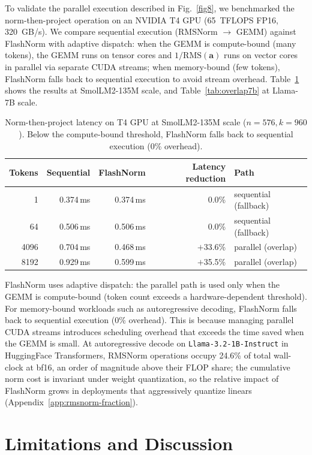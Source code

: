 \documentclass{article}
\begin{document}
To validate the parallel execution described in Fig.~\ref{fig8}, we benchmarked the norm-then-project operation on an NVIDIA T4 GPU (65~TFLOPS FP16, 320~GB/s). We compare sequential execution (RMSNorm $\rightarrow$ GEMM) against FlashNorm with adaptive dispatch: when the GEMM is compute-bound (many tokens), the GEMM runs on tensor cores and $1/\mathrm{RMS}(\mathbf{a})$ runs on vector cores in parallel via separate CUDA streams; when memory-bound (few tokens), FlashNorm falls back to sequential execution to avoid stream overhead. Table~\ref{tab:overlap} shows the results at SmolLM2-135M scale, and Table~\ref{tab:overlap7b} at Llama-7B scale.

\begin{table}[h!] \centering
\caption{Norm-then-project latency on T4 GPU at SmolLM2-135M scale ($n{=}576, k{=}960$). Below the compute-bound threshold, FlashNorm falls back to sequential execution (0\% overhead).}
\label{tab:overlap}
\begin{tabular}{r r r r l}
\hline
Tokens & Sequential & FlashNorm & Latency reduction & Path \\
\hline
1      & 0.374\,ms & 0.374\,ms & $0.0$\% & sequential (fallback) \\
64     & 0.506\,ms & 0.506\,ms & $0.0$\% & sequential (fallback) \\
4096   & 0.704\,ms & 0.468\,ms & $+$33.6\% & parallel (overlap) \\
8192   & 0.929\,ms & 0.599\,ms & $+$35.5\% & parallel (overlap) \\
\hline
\end{tabular}
\end{table}

FlashNorm uses adaptive dispatch: the parallel path is used only when the GEMM is compute-bound (token count exceeds a hardware-dependent threshold). For memory-bound workloads such as autoregressive decoding, FlashNorm falls back to sequential execution (0\% overhead). This is because managing parallel CUDA streams introduces scheduling overhead that exceeds the time saved when the GEMM is small. At autoregressive decode on \texttt{Llama-3.2-1B-Instruct} in HuggingFace Transformers, RMSNorm operations occupy 24.6\% of total wall-clock at bf16, an order of magnitude above their FLOP share; the cumulative norm cost is invariant under weight quantization, so the relative impact of FlashNorm grows in deployments that aggressively quantize linears (Appendix~\ref{app:rmsnorm-fraction}).

\section{Limitations and Discussion}\label{sec:limitations-discussion}
\end{document}
